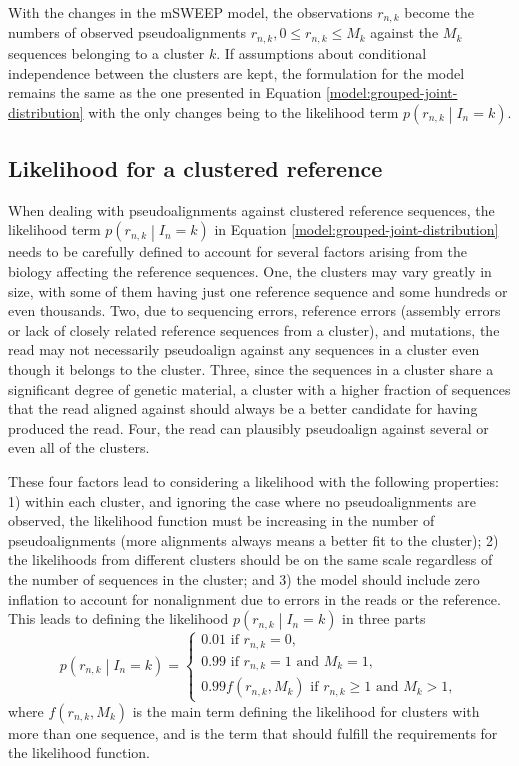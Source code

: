 \documentclass[officiallayout]{tktla}
\begin{document}
With the changes in the mSWEEP model, the observations $r_{n, k}$
become the numbers of observed pseudoalignments $r_{n, k}, 0 \leq
r_{n, k} \leq M_{k}$ against the $M_{k}$ sequences belonging to a
cluster $k$. If assumptions about conditional independence between the clusters
are kept, the formulation for the model remains the same as the one
presented in Equation \ref{model:grouped-joint-distribution} with the
only changes being to the likelihood term $p\left(r_{n, k} \middle|
I_{n} = k\right)$.


\subsection{Likelihood for a clustered reference}

When dealing with pseudoalignments against clustered reference
sequences, the likelihood term $p\left(r_{n, k} \middle| I_{n} =
k\right)$ in Equation \ref{model:grouped-joint-distribution} needs to
be carefully defined to account for several factors arising from the
biology affecting the reference sequences. One, the clusters may vary
greatly in size, with some of them having just one reference sequence
and some hundreds or even thousands. Two, due to sequencing errors,
reference errors (assembly errors or lack of closely related reference
sequences from a cluster), and mutations, the read may not necessarily
pseudoalign against any sequences in a cluster even though it belongs
to the cluster. Three, since the sequences in a cluster share a
significant degree of genetic material, a cluster with a higher
fraction of sequences that the read aligned against should always be a
better candidate for having produced the read. Four, the read can
plausibly pseudoalign against several or even all of the clusters.

These four factors lead to considering a likelihood with the following
properties: 1) within each cluster, and ignoring the case where no
pseudoalignments are observed, the likelihood function must be
increasing in the number of pseudoalignments (more alignments always
means a better fit to the cluster); 2) the likelihoods from different
clusters should be on the same scale regardless of the number of
sequences in the cluster; and 3) the model should include zero
inflation to account for nonalignment due to errors in the reads or
the reference. This leads to defining the likelihood $p\left(r_{n,
  k} \middle| I_{n} = k\right)$ in three parts
\begin{equation}
  \label{likelihood:without-normalization}
  p\left(r_{n, k} \middle| I_{n} = k\right) =
  \begin{cases}
    0.01\text{ if } r_{n, k} = 0, \\
    0.99\text{ if } r_{n, k} = 1 \text{ and } M_{k} = 1, \\
    0.99f\left(r_{n, k}, M_{k}\right)\text{ if } r_{n, k} \geq 1\text{ and } M_{k} > 1,
  \end{cases}
\end{equation}
where $f\left(r_{n, k}, M_{k}\right)$ is the main term defining the
likelihood for clusters with more than one sequence, and is the term
that should fulfill the requirements for the likelihood function.
\end{document}
